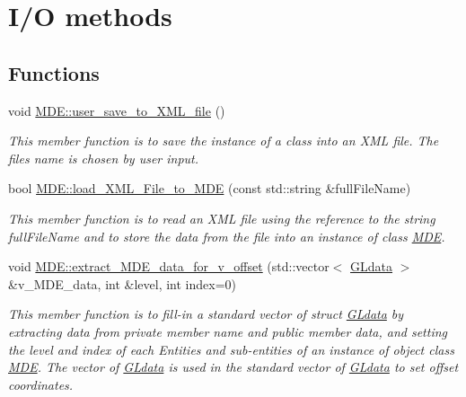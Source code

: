 \hypertarget{group__group__io}{}\section{I/O methods}
\label{group__group__io}
\subsection*{Functions}
\begin{DoxyCompactItemize}
\item 
void \hyperlink{group__group__io_gab0bb5af067d456163cd8d672945acc20}{M\+D\+E\+::user\+\_\+save\+\_\+to\+\_\+\+X\+M\+L\+\_\+file} ()
\begin{DoxyCompactList}\small\item\em This member function is to save the instance of a class into an X\+ML file. The file\textquotesingle{}s name is chosen by user input. \end{DoxyCompactList}\item 
bool \hyperlink{group__group__io_gadd7f1e7519e60fad799462002ddfd6fd}{M\+D\+E\+::load\+\_\+\+X\+M\+L\+\_\+\+File\+\_\+to\+\_\+\+M\+DE} (const std\+::string \&full\+File\+Name)
\begin{DoxyCompactList}\small\item\em This member function is to read an X\+ML file using the reference to the string full\+File\+Name and to store the data from the file into an instance of class \hyperlink{classMDE}{M\+DE}. \end{DoxyCompactList}\item 
void \hyperlink{group__group__io_gad5a5a84a32ba35ff2c35f3a60fb2c44f}{M\+D\+E\+::extract\+\_\+\+M\+D\+E\+\_\+data\+\_\+for\+\_\+v\+\_\+offset} (std\+::vector$<$ \hyperlink{structGLdata}{G\+Ldata} $>$ \&v\+\_\+\+M\+D\+E\+\_\+data, int \&level, int index=0)
\begin{DoxyCompactList}\small\item\em This member function is to fill-\/in a standard vector of struct \hyperlink{structGLdata}{G\+Ldata} by extracting data from private member \textquotesingle{}name\textquotesingle{} and public member \textquotesingle{}data\textquotesingle{}, and setting the level and index of each Entities and sub-\/entities of an instance of object class \hyperlink{classMDE}{M\+DE}. The vector of \hyperlink{structGLdata}{G\+Ldata} is used in the standard vector of \hyperlink{structGLdata}{G\+Ldata} to set offset coordinates. \end{DoxyCompactList}\end{DoxyCompactItemize}


